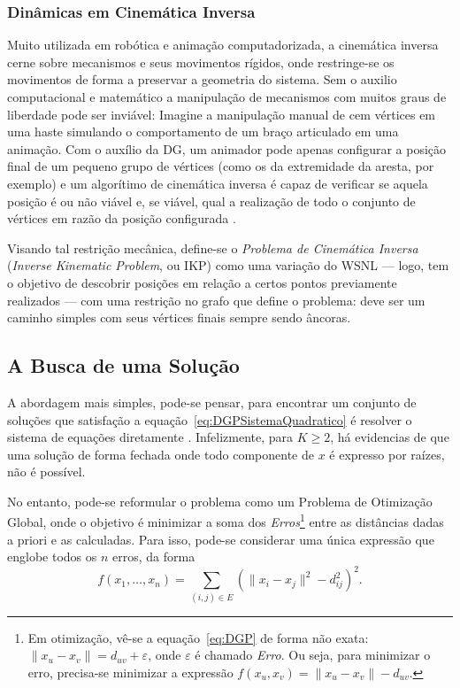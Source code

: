 \subsubsection{Dinâmicas em Cinemática Inversa}

Muito utilizada em robótica e animação computadorizada, a cinemática inversa cerne sobre mecanismos e seus movimentos rígidos, onde restringe-se os movimentos de forma a preservar a geometria do sistema. Sem o auxilio computacional e matemático a manipulação de mecanismos com muitos graus de liberdade  pode ser inviável: Imagine a manipulação manual de cem vértices em uma haste simulando o comportamento de um braço articulado em uma animação. Com o auxílio da DG, um animador pode apenas configurar a posição final de um pequeno grupo de vértices (como os da extremidade da aresta, por exemplo) e um algorítimo de cinemática inversa é capaz de verificar se aquela posição é ou não viável e, se viável, qual a realização de todo o conjunto de vértices em razão da posição configurada \cite{cinematicaInversa}.

Visando tal restrição mecânica, define-se o \textit{Problema de Cinemática Inversa} (\textit{Inverse Kinematic Problem}, ou IKP) como uma variação do WSNL --- logo, tem o objetivo de descobrir posições em relação a certos pontos previamente realizados --- com uma restrição no grafo que define o problema: deve ser um caminho simples com seus vértices finais sempre sendo âncoras.

\subsection{A Busca de uma Solução}

A abordagem mais simples, pode-se pensar, para encontrar um conjunto de soluções que satisfação a equação~\ref{eq:DGPSistemaQuadratico} é resolver o sistema de equações diretamente \cite{carlileBook31Coloquio}. Infelizmente, para $K \geq 2$, há evidencias de que uma solução de forma fechada onde todo componente de $x$ é expresso por raízes, não é possível. 

No entanto, pode-se reformular o problema como um Problema de Otimização Global, onde o objetivo é minimizar a soma dos \textit{Erros}\footnote{Em otimização, vê-se a equação~\ref{eq:DGP} de forma não exata: $\lVert x_u - x_v \rVert = d_{uv} + \varepsilon$, onde $\varepsilon$ é chamado \textit{Erro}. Ou seja, para minimizar o erro, precisa-se minimizar a expressão $f(x_u,x_v) = \lVert x_u - x_v \rVert - d_{uv}$.} entre as distâncias dadas a priori e as calculadas. Para isso, pode-se considerar uma única expressão que englobe todos os $n$ erros, da forma
\begin{equation}
	f(x_1,\dots,x_n) = \sum_{(i,j)\in E} \left(\lVert x_i - x_j \rVert^2 - d_{ij}^2\right)^2.
		\label{eq:problemaOtimizacaoGlobal1}
\end{equation}

